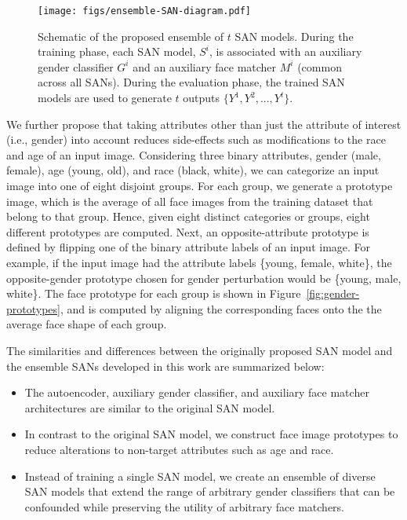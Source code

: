 \documentclass[10pt,twocolumn,letterpaper]{article}
\begin{document}
\begin{figure}[t!]
\begin{center}
   \texttt{[image: figs/ensemble-SAN-diagram.pdf]}
\end{center}
   \caption{Schematic of the proposed ensemble of $t$ SAN models. During the training phase, each SAN model, $S^i$, is associated with an auxiliary gender classifier $G^i$ and an auxiliary face matcher $M^i$ (common across all SANs). During the evaluation phase, the trained SAN models are used to generate $t$ outputs $\{Y^1, Y^2, ..., Y^t\}$.}
\label{fig:ensan-diagram}
\end{figure}

We further propose that taking attributes other than just the attribute of interest (i.e., gender) into account reduces side-effects such as modifications to the race and age of an input image. Considering three binary attributes, gender (male, female), age (young, old), and race (black, white), we can categorize an input image into one of eight disjoint groups. For each group, we generate a prototype image, which is the average of all face images from the training dataset that belong to that group. Hence, given eight distinct categories or groups, eight different prototypes are computed. Next, an opposite-attribute prototype is defined by flipping one of the binary attribute labels of an input image. For example, if the input image had the attribute labels \{young, female, white\}, the opposite-gender prototype chosen for gender perturbation would be \{young, male, white\}. The face prototype for each group is shown in Figure~\ref{fig:gender-prototypes}, and is computed by aligning the corresponding faces onto the the average face shape of each group.

The similarities and differences between the originally proposed SAN model and the ensemble SANs developed in this work are summarized below:
\begin{itemize}[noitemsep]
\item The autoencoder, auxiliary gender classifier, and auxiliary face matcher architectures are similar to the original SAN model.
\item In contrast to the original SAN model, we construct face image prototypes to reduce alterations to non-target attributes such as age and race.
\item Instead of training a single SAN model, we create an ensemble of diverse SAN models that extend the range of arbitrary gender classifiers that can be confounded while preserving the utility of arbitrary face matchers.
\end{itemize}
\end{document}
